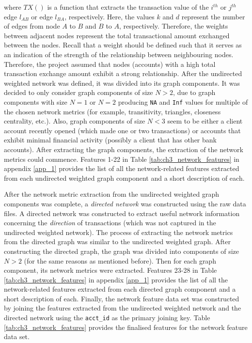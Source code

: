 where $TX()$ is a function that extracts the transaction value of the $i^{th}$ or $j^{th}$ edge $l_{AB}$ or edge $l_{BA}$, respectively. Here, the values $k$ and $d$ represent the number of edges from node $A$ to $B$ and $B$ to $A$, respectively. Therefore, the weights between adjacent nodes represent  the total transactional amount exchanged between the nodes. Recall that a weight should be defined such that it serves as an indication of the strength of the relationship between neighbouring nodes. Therefore, the project assumed that nodes (accounts) with a high total transaction exchange amount exhibit a strong relationship. After the undirected weighted network was defined, it was divided into its graph components. It was decided to only consider graph components of size $N > 2$, due to graph components with size $N=1$ or $N=2$ producing \texttt{NA} and \texttt{Inf} values for multiple of the chosen network metrics (for example, transitivity, triangles, closeness centrality, etc.). Also, graph components of size $N<3$ seem to be either a client account recently opened (which made one or two transactions) or accounts that exhibit minimal financial activity (possibly a client that has other bank accounts). After extracting the graph components, the extraction of the network metrics could commence. Features 1-22 in Table \ref{tab:ch3_network_features} in appendix \ref{app_1} provides the list of all the network-related features extracted from each undirected weighted graph component and a short description of each. 

After the network metric extraction from the undirected weighted graph components was complete, a \textit{directed network} was constructed using the raw data files. A directed network was constructed to extract useful network information concerning the \textit{direction} of transactions (which was not captured in the undirected weighted network). The process of extracting the network metrics from the directed graph was similar to the undirected weighted graph. After constructing the directed graph, the graph was divided into components of size $N>2$ (for the same reasons as mentioned before). Then for each graph component, its network metrics were extracted. Features 23-28 in Table \ref{tab:ch3_network_features} in appendix \ref{app_1} provides the list of all the network-related features extracted from each directed graph component and a short description of each. Finally, the network feature data set was constructed by joining the features extracted from the undirected weighted network and the directed network using the \texttt{acct\_id} as the primary joining key. Table \ref{tab:ch3_network_features} provides the finalised features for the network feature data set. 

